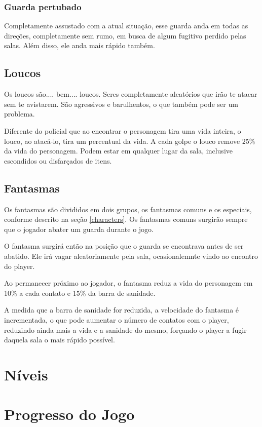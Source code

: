 \subsubsection*{Guarda pertubado}

Completamente assustado com a atual situação, esse guarda anda em todas as direções, completamente sem rumo, em busca de algum fugitivo perdido pelas salas. Além disso, ele anda mais rápido também.

\subsection{Loucos}

Os loucos são.... bem.... loucos. Seres completamente aleatórios que irão te atacar sem te avistarem. São agressivos e barulhentos, o que também pode ser um problema. 

Diferente do policial que ao encontrar o personagem tira uma vida inteira, o louco, ao atacá-lo, tira um percentual da vida. A cada golpe o louco remove 25\% da vida do personagem. Podem estar em qualquer lugar da sala, inclusive escondidos ou disfarçados de itens.

\subsection{Fantasmas}
Os fantasmas são divididos em dois grupos, os fantasmas comuns e os especiais, conforme descrito na seção \ref{characters}. Os fantasmas comuns surgirão sempre que o jogador abater um guarda durante o jogo. 

O fantasma surgirá então na posição que o guarda se encontrava antes de ser abatido. Ele irá vagar aleatoriamente pela sala, ocasionalemnte vindo ao encontro do player. 

Ao permanecer próximo ao jogador, o fantasma reduz a vida do personagem em 10\% a cada contato e 15\% da barra de sanidade.

A medida que a barra de sanidade for reduzida, a velocidade do fantasma é incrementada, o que pode aumentar o número de contatos com o player, reduzindo ainda mais a vida e a sanidade do mesmo, forçando o player a fugir daquela sala o mais rápido possível.

\section{Níveis}

\section{Progresso do Jogo}
